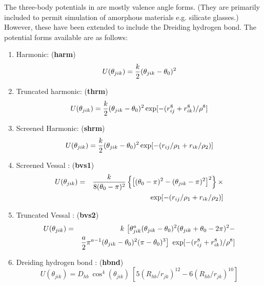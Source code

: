 The three-body potentials in \D are
mostly valence angle forms.  (They
are primarily included to permit simulation of amorphous materials
e.g. silicate glasses.)  However, these have been extended to
include the Dreiding \cite{mayo-90a}
hydrogen bond.  The potential forms available are as follows:
\begin{enumerate}
\item Harmonic:  ({\bf harm})
\begin{equation}
U(\theta_{jik}) = {k \over 2} (\theta_{jik} - \theta_{0})^{2}
\end{equation}
\item Truncated harmonic:  ({\bf thrm})
\begin{equation}
U(\theta_{jik}) = {k \over 2} (\theta_{jik} - \theta_{0})^{2}
\exp[-(r_{ij}^{8} + r_{ik}^{8}) / \rho^{8}]
\end{equation}
\item Screened Harmonic:  ({\bf shrm})
\begin{equation}
 U(\theta_{jik}) = {k \over 2} (\theta_{jik} - \theta_{0})^{2}
\exp[-(r_{ij} / \rho_{1} + r_{ik} / \rho_{2})]
\end{equation}
\item Screened Vessal \cite{vessal-94a}:  ({\bf bvs1})
\begin{eqnarray}
U(\theta_{jik}) &=& {k \over 8(\theta_{0}-\pi)^{2}} \left\{ \left[
(\theta_{0} -\pi)^{2} -(\theta_{jik}-\pi)^{2} \right]^{2} \right\} \times \nonumber \\
& & \exp[-(r_{ij} / \rho_{1} + r_{ik} / \rho_{2})]
\end{eqnarray}
\item Truncated Vessal \cite{smith-95a}:  ({\bf bvs2})
\begin{eqnarray}
U(\theta_{jik})&=& k~\big[ \theta_{jik}^a (\theta_{jik}-\theta_0)^{2}
(\theta_{jik}+\theta_{0}-2\pi)^{2} - \nonumber \\
 & & {a \over 2} \pi^{a-1} (\theta_{jik}-\theta_{0})^{2}(\pi -
\theta_{0})^{3}\big]~\exp[-(r_{ij}^{8} + r_{ik}^{8}) / \rho^{8}]
\end{eqnarray}
\item Dreiding hydrogen bond \cite{mayo-90a}:  ({\bf hbnd})
\begin{equation}
U(\theta_{jik}) =
D_{hb}~\cos^{4}(\theta_{jik})~[5(R_{hb}/r_{jk})^{12}-6(R_{hb}/r_{jk})^{10}]
\end{equation}
\end{enumerate}
